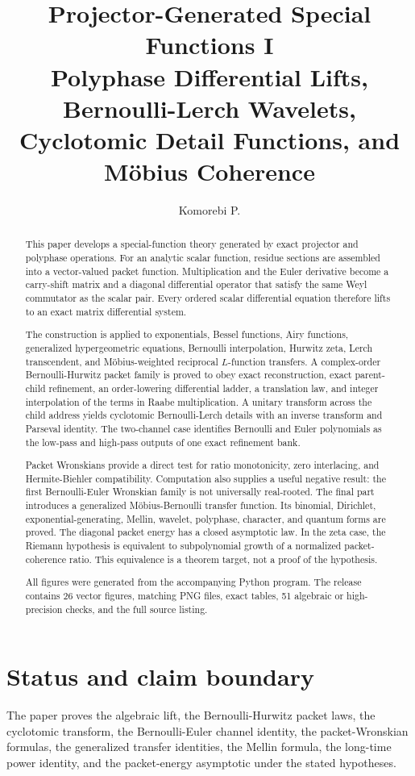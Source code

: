 \documentclass[11pt,openany]{report}
\title{\textbf{Projector-Generated Special Functions I}\\[0.25em]
\Large Polyphase Differential Lifts, Bernoulli-Lerch Wavelets, Cyclotomic Detail Functions, and M\"obius Coherence}
\author{Komorebi P.}
\date{}
\theoremstyle{definition}
\theoremstyle{remark}
\begin{document}
\maketitle

\begin{abstract}
This paper develops a special-function theory generated by exact projector and polyphase operations. For an analytic scalar function, residue sections are assembled into a vector-valued packet function. Multiplication and the Euler derivative become a carry-shift matrix and a diagonal differential operator that satisfy the same Weyl commutator as the scalar pair. Every ordered scalar differential equation therefore lifts to an exact matrix differential system.

The construction is applied to exponentials, Bessel functions, Airy functions, generalized hypergeometric equations, Bernoulli interpolation, Hurwitz zeta, Lerch transcendent, and M\"obius-weighted reciprocal $L$-function transfers. A complex-order Bernoulli-Hurwitz packet family is proved to obey exact reconstruction, exact parent-child refinement, an order-lowering differential ladder, a translation law, and integer interpolation of the terms in Raabe multiplication. A unitary transform across the child address yields cyclotomic Bernoulli-Lerch details with an inverse transform and Parseval identity. The two-channel case identifies Bernoulli and Euler polynomials as the low-pass and high-pass outputs of one exact refinement bank.

Packet Wronskians provide a direct test for ratio monotonicity, zero interlacing, and Hermite-Biehler compatibility. Computation also supplies a useful negative result: the first Bernoulli-Euler Wronskian family is not universally real-rooted. The final part introduces a generalized M\"obius-Bernoulli transfer function. Its binomial, Dirichlet, exponential-generating, Mellin, wavelet, polyphase, character, and quantum forms are proved. The diagonal packet energy has a closed asymptotic law. In the zeta case, the Riemann hypothesis is equivalent to subpolynomial growth of a normalized packet-coherence ratio. This equivalence is a theorem target, not a proof of the hypothesis.

All figures were generated from the accompanying Python program. The release contains 26 vector figures, matching PNG files, exact tables, 51 algebraic or high-precision checks, and the full source listing.
\end{abstract}

\chapter*{Status and claim boundary}
The paper proves the algebraic lift, the Bernoulli-Hurwitz packet laws, the cyclotomic transform, the Bernoulli-Euler channel identity, the packet-Wronskian formulas, the generalized transfer identities, the Mellin formula, the long-time power identity, and the packet-energy asymptotic under the stated hypotheses.
\end{document}
